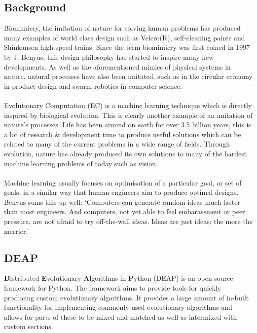 \documentclass{article}
\begin{document}
\subsection{Background}
Biomimicry, the imitation of nature for solving human problems has produced many examples of world class design such as Velcro(R), self-cleaning paints and Shinkansen high-speed trains\cite{biomimicry}.  Since the term biomimicry was first coined in 1997 by J. Benyus, this design philosophy has started to inspire many new developments. As well as the aforementioned mimics of physical systems in nature, natural processes have also been imitated, such as in the circular economy in product design and swarm robotics in computer science.
\\\\
Evolutionary Computation (EC) is a machine learning technique which is directly inspired by biological evolution. This is clearly another example of an imitation of nature's processes. Life has been around on earth for over 3.5 billion years, this is a lot of research \& development time to produce useful solutions which can be related to many of the current problems in a wide range of fields. Through evolution, nature has already produced its own solutions to many of the hardest machine learning problems of today such as vision.
\\\\
Machine learning usually focuses on optimisation of a particular goal, or set of goals, in a similar way that human engineers aim to produce optimal designs. Benyus sums this up well: `Computers can generate random ideas much faster than most engineers. And computers, not yet able to feel embarassment or peer pressure, are not afraid to try off-the-wall ideas. Ideas are just ideas; the more the merrier.'\cite[pp.209]{biomimicry}

\subsection{DEAP}
\textbf{D}istributed \textbf{E}volutionary \textbf{A}lgorithms in \textbf{P}ython (DEAP) is an open source framework for Python\cite{deap}. The framework aims to provide tools for quickly producing custom evolutionary algorithms. It provides a large amount of in-built functionality for implementing commonly used evolutionary algorithms and allows for parts of these to be mixed and matched as well as intermixed with custom sections. %
\end{document}
